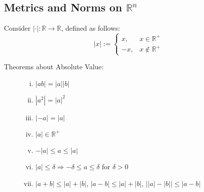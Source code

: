\documentclass[10pt]{extarticle}
\newcommand{\R}{\mathbb{R}}
\begin{document}
  \subsection{Metrics and Norms on $\R^n$}%
    Consider $|\cdot|: \R \rightarrow \R$, defined as follows:
    \[
      |x| := \begin{cases}
        x,&x\in\R^+\\
        -x,&x\notin\R^+
      \end{cases}
    \] 
    \begin{description}
      \item[Theorems about Absolute Value:]\hfill
        \begin{enumerate}[(i)]
          \item $|ab| = |a||b|$
          \item $|a^2| = |a|^2$
          \item $|-a| = |a|$
          \item $|a|\in\R^+$
          \item $-|a| \leq a \leq |a|$
          \item $|a| \leq \delta \Rightarrow -\delta \leq a \leq \delta$ for $\delta > 0$
          \item $|a+b| \leq |a| + |b|$, $|a-b| \leq |a| + |b|$, $\vert|a| - |b|\vert \leq |a-b|$
        \end{enumerate}
    \end{description}
\end{document}
